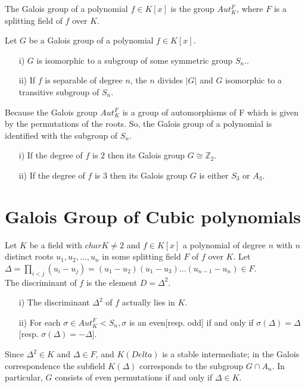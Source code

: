\begin{definition}
  The Galois group of a polynomial \(f \in K[x]\) is the group \(Aut_K^F\), where \(F\) is a splitting field of \(f\) over \(K\).
  \end{definition}

  \begin{theorem}
  Let \(G\) be a Galois group of a polynomial \(f \in K[x]\).
\begin{enumerate}
\item[i)] \(G\) is isomorphic to a subgroup of some symmetric group \(S_n\)..
  \item[ii)] If \(f\) is separable of degree \(n\), the \(n\) divides \(|G|\) and \(G\) isomorphic to a transitive subgroup of \(S_n\).
  \end{enumerate}
\end{theorem}
Because the Galois group \(Aut_K^F\) is a group of automorphisms of F which is given by the permutations of the roots.
So, the Galois group of a polynomial is identified with the subgroup of \(S_n\).\\

\begin{corollary}
\begin{enumerate}
\item[i)] If the degree of \(f\) is \(2\) then its Galois group \(G \cong {\mathbb{Z}}_2\).
  \item[ii)] If the degree of \(f\) is \(3\) then its Galois group \(G\) is either \(S_3\) or \(A_3\).
  \end{enumerate}
\end{corollary}


\section{Galois Group of Cubic polynomials}
\begin{definition}
  Let \(K\) be a field with \(char K \neq 2\) and \(f \in K[x]\) a polynomial of degree \(n\) with \(n\) distinct roots \(u_1,u_2,...,u_n\) in some splitting field \(F\) of \(f\) over \(K\). Let \(\Delta = \prod\limits_{i<j}(u_i-u_j) = (u_1-u_2)(u_1-u_3)...(u_{n-1}-u_n) \in F\).\\
  The discriminant of \(f\) is the element \(D= {\Delta}^2\).
\end{definition}

\begin{theorem}
\begin{enumerate}
\item[i)] The discriminant \({\Delta}^2\) of \(f\) actually lies in \(K\).
  \item[ii)] For each \(\sigma \in Aut_K^F < S_n, \sigma\) is an even[resp. odd] if and only if \(\sigma(\Delta) = \Delta\)[resp. \(\sigma(\Delta) = - \Delta\)].
  \end{enumerate}
\end{theorem}
Since \({\Delta}^2 \in K\) and \(\Delta \in F\), and \(K(Delta)\) is a stable intermediate; in the Galois correspondence the subfield \(K(\Delta)\) corresponds to the subgroup \(G \cap A_n\). In particular, \(G\) consists of even permutations if and only if \(\Delta \in K\).

